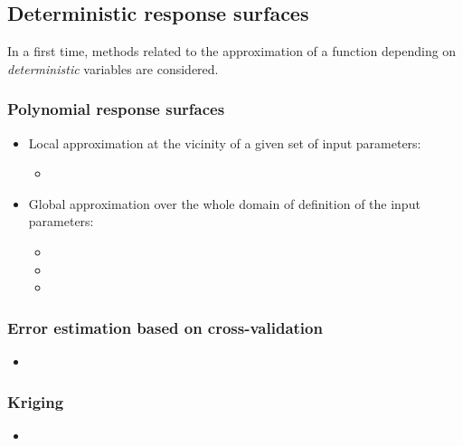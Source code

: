 
\subsection{Deterministic response surfaces}

In a first time, methods related to the approximation of a function depending on \emph{deterministic} variables are considered.

\subsubsection{Polynomial response surfaces}


\begin{itemize}
\item Local approximation at the vicinity of a given set of input parameters:
\begin{itemize}
\item {}
\end{itemize}
\item Global approximation over the whole domain of definition of the input parameters:
\begin{itemize}
\item {}
\item {}
\item {}
\end{itemize}
\end{itemize}

\subsubsection{Error estimation based on cross-validation}
\begin{itemize}
\item {}
\end{itemize}

\subsubsection{Kriging}
\begin{itemize}
\item {}
\end{itemize}

